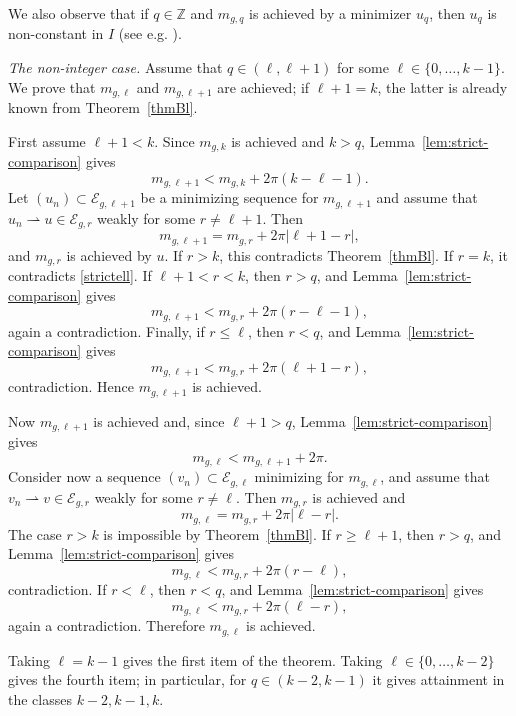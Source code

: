 \documentclass[12pt, a4paper]{article}
\renewcommand{\(}{\left(}
\renewcommand{\)}{\right)}
\begin{document}
We also observe that if $q\in\mathbb Z$ and $m_{g,q}$ is achieved by a minimizer $u_q$, then  $u_q$ is non-constant in $I$ (see e.g. \cite[Lemma 4.3]{HM}).

\medskip

\noindent\emph{The non-integer case.}
Assume that $q\in(\ell,\ell+1)$ for some $\ell\in\{0,\dots,k-1\}$. We prove that $m_{g,\ell}$ and $m_{g,\ell+1}$ are achieved; if $\ell+1=k$, the latter is already known from Theorem~\ref{thmBl}.

First assume $\ell+1<k$. Since $m_{g,k}$ is achieved and $k>q$, Lemma~\ref{lem:strict-comparison} gives
\begin{equation}\label{strictell}
 m_{g,\ell+1}<m_{g,k}+2\pi(k-\ell-1).
\end{equation}
Let $(u_n)\subset \mathcal{E}_{g,\ell+1}$ be a minimizing sequence for $m_{g,\ell+1}$ and assume that $u_n\rightharpoonup u\in \mathcal{E}_{g,r}$ weakly for some $r\neq \ell+1$. Then
\[
 m_{g,\ell+1}=m_{g,r}+2\pi|\ell+1-r|,
\]
and $m_{g,r}$ is achieved by $u$. If $r>k$, this contradicts Theorem~\ref{thmBl}. If $r=k$, it contradicts \eqref{strictell}. If $\ell+1<r<k$, then $r>q$, and Lemma~\ref{lem:strict-comparison} gives
\[
 m_{g,\ell+1}<m_{g,r}+2\pi(r-\ell-1),
\]
again a contradiction. Finally, if $r\le \ell$, then $r<q$, and Lemma~\ref{lem:strict-comparison} gives
\[
 m_{g,\ell+1}<m_{g,r}+2\pi(\ell+1-r),
\]
contradiction. Hence $m_{g,\ell+1}$ is achieved.

Now $m_{g,\ell+1}$ is achieved and, since $\ell+1>q$, Lemma~\ref{lem:strict-comparison} gives
\[
 m_{g,\ell}<m_{g,\ell+1}+2\pi.
\]
Consider now a sequence $(v_n)\subset \mathcal{E}_{g,\ell}$ minimizing for $m_{g,\ell}$, and assume that $v_n\rightharpoonup v\in \mathcal{E}_{g,r}$ weakly for some $r\neq \ell$. Then $m_{g,r}$ is achieved and
\begin{equation}\label{mgell}
 m_{g,\ell}=m_{g,r}+2\pi|\ell-r|.
\end{equation}
The case $r>k$ is impossible by Theorem~\ref{thmBl}. If $r\ge \ell+1$, then $r>q$, and Lemma~\ref{lem:strict-comparison} gives
\[
 m_{g,\ell}<m_{g,r}+2\pi(r-\ell),
\]
contradiction. If $r<\ell$, then $r<q$, and Lemma~\ref{lem:strict-comparison} gives
\[
 m_{g,\ell}<m_{g,r}+2\pi(\ell-r),
\]
again a contradiction. Therefore $m_{g,\ell}$ is achieved.

Taking $\ell=k-1$ gives the first item of the theorem. Taking $\ell\in\{0,\dots,k-2\}$ gives the fourth item; in particular, for $q\in(k-2,k-1)$ it gives attainment in the classes $k-2,k-1,k$.
\end{document}
